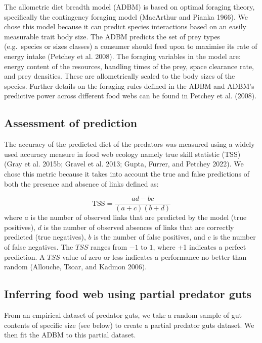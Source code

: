 \documentclass{article}
\begin{document}
The allometric diet breadth model (ADBM) is based on optimal foraging
theory, specifically the contingency foraging model (MacArthur and
Pianka 1966). We chose this model because it can predict species
interactions based on an easily measurable trait body size. The ADBM
predicts the set of prey types (e.g.~species or sizes classes) a
consumer should feed upon to maximise its rate of energy intake (Petchey
et al. 2008). The foraging variables in the model are: energy content of
the resources, handling times of the prey, space clearance rate, and
prey densities. These are allometrically scaled to the body sizes of the
species. Further details on the foraging rules defined in the ADBM and
ADBM's predictive power across different food webs can be found in
Petchey et al. (2008).

\hypertarget{assessment-of-prediction}{%
\subsection{Assessment of prediction}\label{assessment-of-prediction}}

The accuracy of the predicted diet of the predators was measured using a
widely used accuracy measure in food web ecology namely true skill
statistic (TSS) (Gray et al. 2015b; Gravel et al. 2013; Gupta, Furrer,
and Petchey 2022). We chose this metric because it takes into account
the true and false predictions of both the presence and absence of links
defined as:

\[ \text{TSS} = \frac{ad-bc}{(a+c)(b+d)} \] where \(a\) is the number of
observed links that are predicted by the model (true positives), \(d\)
is the number of observed absences of links that are correctly predicted
(true negatives), \(b\) is the number of false positives, and \(c\) is
the number of false negatives. The \(TSS\) ranges from \(-1\) to \(1\),
where +1 indicates a perfect prediction. A \(TSS\) value of zero or less
indicates a performance no better than random (Allouche, Tsoar, and
Kadmon 2006).

\hypertarget{inferring-food-web-using-partial-predator-guts}{%
\subsection{Inferring food web using partial predator
guts}\label{inferring-food-web-using-partial-predator-guts}}

From an empirical dataset of predator guts, we take a random sample of
gut contents of specific size (see below) to create a partial predator
guts dataset. We then fit the ADBM to this partial dataset.
\end{document}
